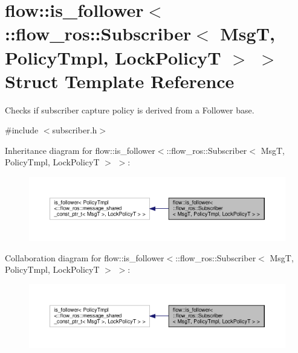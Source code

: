 \hypertarget{structflow_1_1is__follower_3_1_1flow__ros_1_1_subscriber_3_01_msg_t_00_01_policy_tmpl_00_01_lock_policy_t_01_4_01_4}{}\section{flow\+:\+:is\+\_\+follower$<$\+:\+:flow\+\_\+ros\+:\+:Subscriber$<$ MsgT, Policy\+Tmpl, Lock\+PolicyT $>$ $>$ Struct Template Reference}
\label{structflow_1_1is__follower_3_1_1flow__ros_1_1_subscriber_3_01_msg_t_00_01_policy_tmpl_00_01_lock_policy_t_01_4_01_4}


Checks if subscriber capture policy is derived from a Follower base.  




{\ttfamily \#include $<$subscriber.\+h$>$}



Inheritance diagram for flow\+:\+:is\+\_\+follower$<$\+:\+:flow\+\_\+ros\+:\+:Subscriber$<$ MsgT, Policy\+Tmpl, Lock\+PolicyT $>$ $>$\+:\nopagebreak
\begin{figure}[H]
\begin{center}
\leavevmode
\includegraphics[width=350pt]{structflow_1_1is__follower_3_1_1flow__ros_1_1_subscriber_3_01_msg_t_00_01_policy_tmpl_00_01_lock05a79c2370d5be3b044e2172583e7cc1}
\end{center}
\end{figure}


Collaboration diagram for flow\+:\+:is\+\_\+follower$<$\+:\+:flow\+\_\+ros\+:\+:Subscriber$<$ MsgT, Policy\+Tmpl, Lock\+PolicyT $>$ $>$\+:\nopagebreak
\begin{figure}[H]
\begin{center}
\leavevmode
\includegraphics[width=350pt]{structflow_1_1is__follower_3_1_1flow__ros_1_1_subscriber_3_01_msg_t_00_01_policy_tmpl_00_01_lock46fa4a97b2692d84fdf345a45fec317b}
\end{center}
\end{figure}


